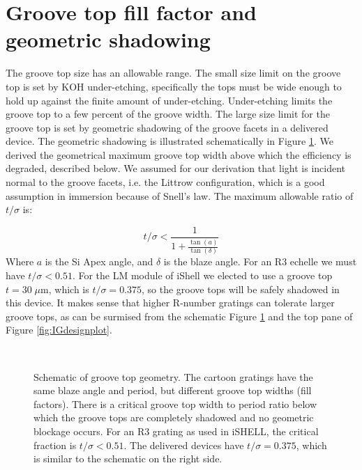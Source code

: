 \section{Groove top fill factor and geometric shadowing}
The groove top size has an allowable range.  The small size limit on the groove top is set by KOH under-etching, specifically the tops must be wide enough to hold up against the finite amount of under-etching.  Under-etching limits the groove top to a few percent of the groove width.  The large size limit for the groove top is set by geometric shadowing of the groove facets in a delivered device.  The geometric shadowing is illustrated schematically in Figure \ref{fig:groovetop}.  We derived the geometrical maximum groove top width above which the efficiency is degraded, described below.  We assumed for our derivation that light is incident normal to the groove facets, i.e. the Littrow configuration, which is a good assumption in immersion because of Snell's law.  The maximum allowable ratio of $t/\sigma$ is:

\begin{equation*}
t/\sigma < \frac{1}{1 + \frac{\tan(a)}{\tan(\delta)}}
\end{equation*}
Where $a$ is the Si Apex angle, and $\delta$ is the blaze angle.  For an R3 echelle we must have $t/\sigma < 0.51$.  For the LM module of iShell we elected to use a groove top $t=30 \; \mu$m, which is $t/\sigma=0.375$, so the groove tops will be safely shadowed in this device.  It makes sense that higher R-number gratings can tolerate larger groove tops, as can be surmised from the schematic Figure \ref{fig:groovetop} and the top pane of Figure \ref{fig:IGdesignplot}.


\begin{figure}[h!] 
\begin{center}
\ 
\caption[Schematic of groove top geometry]{Schematic of groove top geometry.  The cartoon gratings have the same blaze angle and period, but different groove top widths (fill factors).  There is a critical groove top width to period ratio below which the groove tops are completely shadowed and no geometric blockage occurs.  For an R3 grating as used in iSHELL, the critical fraction is $t/\sigma < 0.51$.  The delivered devices have $t/\sigma = 0.375$, which is similar to the schematic on the right side.}
\label{fig:groovetop}
\end{center}
\end{figure}

